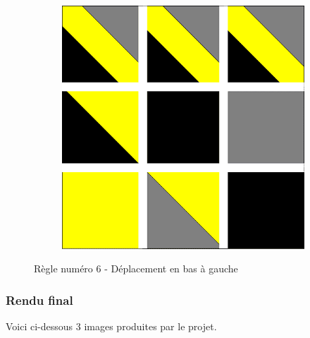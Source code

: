 \documentclass[a4paper]{article}
\begin{document}
\begin{figure}[!h]
\begin{subfigure}[t]{0.17\textwidth}
    \end{subfigure}
    \hfill
    \begin{subfigure}[t]{0.17\textwidth}
        \includegraphics[width=\textwidth]{img/rule61.png}
    \end{subfigure}
    \caption{Règle numéro 6 - Déplacement en bas à gauche}
\end{figure}

\newpage
\subsubsection{Rendu final}
Voici ci-dessous 3 images produites par le projet.
\end{document}

